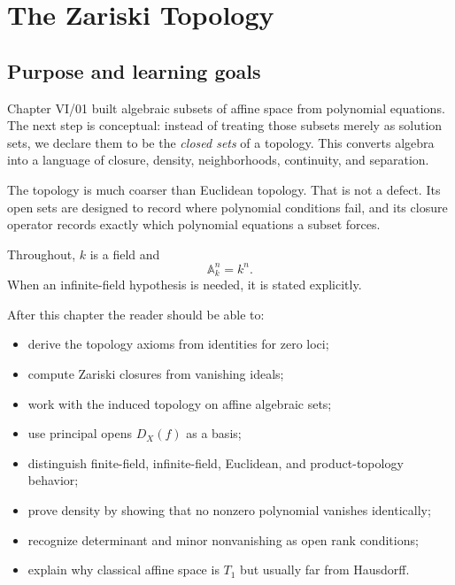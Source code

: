 %

\chapter{The Zariski Topology}
\label{ch:zariski-topology}

\section*{Purpose and learning goals}

Chapter VI/01 built algebraic subsets of affine space from polynomial equations.  The next
step is conceptual: instead of treating those subsets merely as solution sets, we declare
them to be the \emph{closed sets} of a topology.  This converts algebra into a language of
closure, density, neighborhoods, continuity, and separation.

The topology is much coarser than Euclidean topology.  That is not a defect.  Its open sets
are designed to record where polynomial conditions fail, and its closure operator records
exactly which polynomial equations a subset forces.

Throughout, \(k\) is a field and
\[
  \mathbb A_k^n=k^n.
\]
When an infinite-field hypothesis is needed, it is stated explicitly.

After this chapter the reader should be able to:
\begin{itemize}
\item derive the topology axioms from identities for zero loci;
\item compute Zariski closures from vanishing ideals;
\item work with the induced topology on affine algebraic sets;
\item use principal opens \(D_X(f)\) as a basis;
\item distinguish finite-field, infinite-field, Euclidean, and product-topology behavior;
\item prove density by showing that no nonzero polynomial vanishes identically;
\item recognize determinant and minor nonvanishing as open rank conditions;
\item explain why classical affine space is \(T_1\) but usually far from Hausdorff.
\end{itemize}

